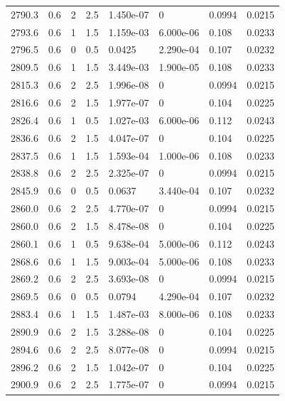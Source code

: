\documentclass[preview]{standalone}
\begin{document}
{{{{{{{{{{\begin{tabular}{L{1.2cm}C{1.2cm} C{0.3cm}C{0.5cm} C{1.4cm}C{1.4cm} C{1.4cm}C{1.4cm}}
  2790.3  &   0.6  & 2     & 2.5 &  1.450e-07  & 0  & 0.0994 &  0.0215   \\ 
  2793.6  &   0.6  & 1     & 1.5 &  1.159e-03  & 6.000e-06  & 0.108 &  0.0233   \\ 
  2796.5  &   0.6  & 0     & 0.5 &  0.0425  & 2.290e-04  & 0.107 &  0.0232   \\ 
  2809.5  &   0.6  & 1     & 1.5 &  3.449e-03  & 1.900e-05  & 0.108 &  0.0233   \\ 
  2815.3  &   0.6  & 2     & 2.5 &  1.996e-08  & 0  & 0.0994 &  0.0215   \\ 
  2816.6  &   0.6  & 2     & 1.5 &  1.977e-07  & 0  & 0.104 &  0.0225   \\ 
  2826.4  &   0.6  & 1     & 0.5 &  1.027e-03  & 6.000e-06  & 0.112 &  0.0243   \\ 
  2836.6  &   0.6  & 2     & 1.5 &  4.047e-07  & 0  & 0.104 &  0.0225   \\ 
  2837.5  &   0.6  & 1     & 1.5 &  1.593e-04  & 1.000e-06  & 0.108 &  0.0233   \\ 
  2838.8  &   0.6  & 2     & 2.5 &  2.325e-07  & 0  & 0.0994 &  0.0215   \\ 
  2845.9  &   0.6  & 0     & 0.5 &  0.0637  & 3.440e-04  & 0.107 &  0.0232   \\ 
  2860.0  &   0.6  & 2     & 2.5 &  4.770e-07  & 0  & 0.0994 &  0.0215   \\ 
  2860.0  &   0.6  & 2     & 1.5 &  8.478e-08  & 0  & 0.104 &  0.0225   \\ 
  2860.1  &   0.6  & 1     & 0.5 &  9.638e-04  & 5.000e-06  & 0.112 &  0.0243   \\ 
  2868.6  &   0.6  & 1     & 1.5 &  9.003e-04  & 5.000e-06  & 0.108 &  0.0233   \\ 
  2869.2  &   0.6  & 2     & 2.5 &  3.693e-08  & 0  & 0.0994 &  0.0215   \\ 
  2869.5  &   0.6  & 0     & 0.5 &  0.0794  & 4.290e-04  & 0.107 &  0.0232   \\ 
  2883.4  &   0.6  & 1     & 1.5 &  1.487e-03  & 8.000e-06  & 0.108 &  0.0233   \\ 
  2890.9  &   0.6  & 2     & 1.5 &  3.288e-08  & 0  & 0.104 &  0.0225   \\ 
  2894.6  &   0.6  & 2     & 2.5 &  8.077e-08  & 0  & 0.0994 &  0.0215   \\ 
  2896.2  &   0.6  & 2     & 1.5 &  1.042e-07  & 0  & 0.104 &  0.0225   \\ 
  2900.9  &   0.6  & 2     & 2.5 &  1.775e-07  & 0  & 0.0994 &  0.0215   \\ 

\end{tabular}}}}}}}}}}}
\end{document}

